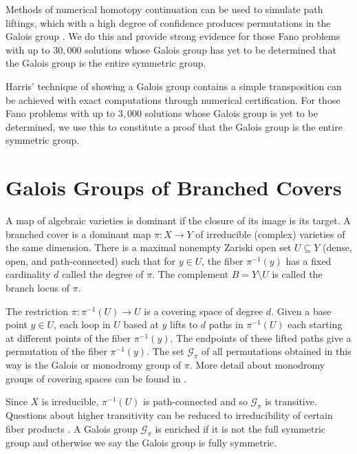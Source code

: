 \documentclass[12pt]{amsart}
\theoremstyle{definition}
\newcommand{\gal}{\mathcal{G}}
\newcommand{\defcolor}[1]{{\color{RoyalBlue}#1}}
\begin{document}
Methods of numerical homotopy continuation can be used to simulate path liftings, which with a high degree of confidence produces permutations in the Galois group \cite{ngalois}. We do this and provide strong evidence for those Fano problems with up to $30,000$ solutions whose Galois group has yet to be determined that the Galois group is the entire symmetric group.

Harris' technique of showing a Galois group contains a simple transposition can be achieved with exact computations through numerical certification. For those Fano problems with up to $3,000$ solutions whose Galois group is yet to be determined, we use this to constitute a proof that the Galois group is the entire symmetric group. 



\section{Galois Groups of Branched Covers}
%   
A map of algebraic varieties is dominant if the closure of its image is its target. A \defcolor{branched cover} is a dominant map $\pi:X\to Y$ of irreducible (complex) varieties of the same dimension. There is a maximal nonempty Zariski open set $U\subseteq Y$ (dense, open, and path-connected) such that for $y\in U$, the fiber $\pi^{-1}(y)$ has a fixed cardinality $d$ called the \defcolor{degree of $\pi$}. The complement $B = Y\setminus U$ is called the \defcolor{branch locus} of $\pi$.



%
The restriction $\pi:\pi^{-1}(U)\to U$ is a covering space of degree $d$. Given a base point $y\in U$, each loop in $U$ based at $y$ lifts to $d$ paths in $\pi^{-1}(U)$ each starting at different points of the fiber $\pi^{-1}(y)$. The endpoints of these lifted paths give a permutation of the fiber $\pi^{-1}(y)$. The set $\gal_\pi$ of all permutations obtained in this way is the \defcolor{Galois} or \defcolor{monodromy group} of $\pi$. More detail about monodromy groups of covering spaces can be found in \cite{Hatcher}. 

Since $X$ is irreducible, $\pi^{-1}(U)$ is path-connected and so $\gal_\pi$ is transitive. Questions about higher transitivity can be reduced to irreducibility of certain fiber products \cite{ngalois,GGEGA}. A Galois group $\gal_\pi$ is \defcolor{enriched} if it is not the full symmetric group and otherwise we say the Galois group is \defcolor{fully symmetric}.
\end{document}
